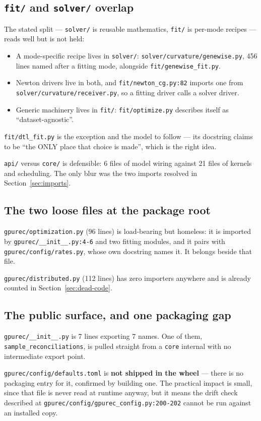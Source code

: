 \documentclass[11pt]{article}
\newcommand{\loc}[1]{\nolinkurl{#1}}
\newcommand{\dir}[1]{\nolinkurl{#1}}
\begin{document}
\subsection{\texorpdfstring{\dir{fit/} and \dir{solver/} overlap}{fit/ and solver/ overlap}}

The stated split --- \dir{solver/} is reusable mathematics, \dir{fit/} is
per-mode recipes --- reads well but is not held:

\begin{itemize}
  \item A mode-specific recipe lives in \dir{solver/}:
        \dir{solver/curvature/genewise.py}, 456 lines named after a fitting
        mode, alongside \dir{fit/genewise\_fit.py}.
  \item Newton drivers live in both, and \loc{fit/newton\_cg.py:82} imports one
        from \dir{solver/curvature/receiver.py}, so a fitting driver calls a
        solver driver.
  \item Generic machinery lives in \dir{fit/}: \dir{fit/optimize.py} describes
        itself as ``dataset-agnostic''.
\end{itemize}

\dir{fit/dtl\_fit.py} is the exception and the model to follow --- its docstring
claims to be ``the ONLY place that choice is made'', which is the right idea.

\dir{api/} versus \dir{core/} is defensible: 6 files of model wiring against 21
files of kernels and scheduling.  The only blur was the two imports resolved in
Section~\ref{sec:imports}.

\subsection{The two loose files at the package root}

\dir{gpurec/optimization.py} (96 lines) is load-bearing but homeless: it is
imported by \loc{gpurec/\_\_init\_\_.py:4-6} and two fitting modules, and it
pairs with \dir{gpurec/config/rates.py}, whose own docstring names it.  It
belongs beside that file.

\dir{gpurec/distributed.py} (112 lines) has zero importers anywhere and is
already counted in Section~\ref{sec:dead-code}.

\subsection{The public surface, and one packaging gap}

\dir{gpurec/\_\_init\_\_.py} is 7 lines exporting 7 names.  One of them,
\texttt{sample\_reconciliations}, is pulled straight from a \dir{core} internal
with no intermediate export point.

\dir{gpurec/config/defaults.toml} is \textbf{not shipped in the wheel} --- there
is no packaging entry for it, confirmed by building one.  The practical impact
is small, since that file is never read at runtime anyway, but it means the
drift check described at \loc{gpurec/config/gpurec\_config.py:200-202} cannot be
run against an installed copy.
\end{document}
